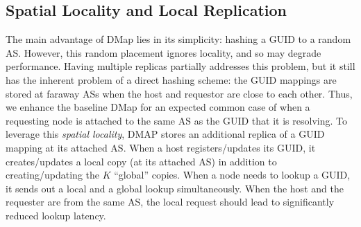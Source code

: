 
\vspace{-0.3in}
\subsection{Spatial Locality and Local Replication}
\label{sec:locality}

The main advantage of DMap lies in its simplicity: hashing a GUID to a random AS.  However, this random placement ignores locality, and so may degrade performance.  Having multiple replicas partially addresses this problem, but it still has the inherent problem of a direct hashing scheme: the GUID mappings are stored at faraway ASs when the host and requestor are close to each other.  Thus, we enhance the baseline DMap for an expected common case of when a requesting node is attached to the same AS as the GUID that it is resolving.  To leverage this \emph{spatial locality}, DMAP stores an additional replica of a GUID mapping at its attached AS.  When a host registers/updates its GUID, it creates/updates a local copy (at its attached AS) in addition to creating/updating the $K$ ``global'' copies. When a node needs to lookup a GUID, it sends out a local and a global lookup simultaneously.  When the host and the requester are from the same AS, the local request should lead to significantly reduced lookup latency.

